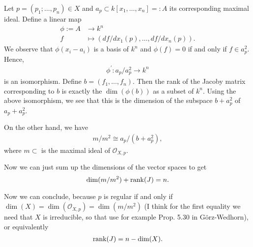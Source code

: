 \newcommand{\sheet}{12}




\maketitle{}

\begin{exercise}{2}
    Let $p=(p_1;\dots,p_n)\in X$ and $a_p\subset k[x_1,\dots,x_n]=:A$ its corresponding maximal ideal. Define a linear map
    \begin{align*}
        \phi := A &\to k^n\\
        f&\mapsto ({df}/{dx_1}(p),\dots, {df}/{dx_n}(p)).
    \end{align*}
    We observe that $\phi(x_i-a_i)$ is a basis of $k^n$ and $\phi(f)=0$ if and only if $f\in a_p^2$. Hence,
    \begin{align*}
        \phi^\prime:a_p/a_p^2 \to k^n
    \end{align*}
    is an isomorphism. Define $b=(f_1,\dots, f_n).$ Then the rank of the Jacoby matrix corresponding to $b$
    is exactly the $\dim(\phi(b))$ as a subset of $k^n$. Using the above isomorphism, we see that this is the dimension
    of the subspace $b+a_p^2$ of $a_p+a_p^2$.

    On the other hand, we have 
    \begin{align*}
        m/m^2\cong a_p/(b+a_p^2),
    \end{align*}
    where $m\subset$ is the maximal ideal of $\mathcal{O}_{X,p}.$ 

    Now we can just sum up the dimensions of the vector spaces to get
    \begin{align*}
        \dim(m/m^2)+\operatorname{rank}(J)=n.
    \end{align*}

    Now we can conclude, because $p$ is regular if and only if $\dim(X)=\dim(\mathcal{O}_{X,p})=\dim(m/m^2)$ (I think for the first 
    equality we need that $X$ is irreducible, so that use for example Prop. 5.30 in Görz-Wedhorn),
     or equivalently
    \begin{align*}
        \operatorname{rank}(J)=n-\dim(X).
    \end{align*}
\end{exercise}

